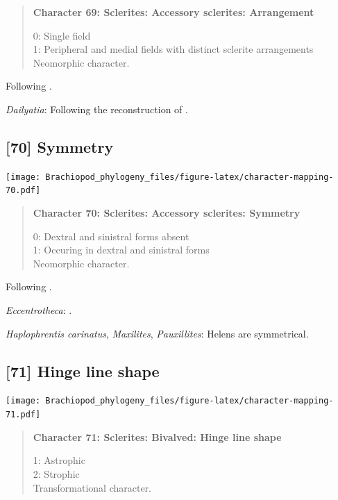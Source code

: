 \documentclass[openany]{book}
\begin{document}
\begin{quote}
\textbf{Character 69: Sclerites: Accessory sclerites: Arrangement}

0: Single field\\
1: Peripheral and medial fields with distinct sclerite arrangements\\
Neomorphic character.
\end{quote}

Following \citet{Zhao2017}.

\hypertarget{Dailyatia-coding-69}{}
\emph{Dailyatia}: Following the reconstruction of
\citet{Skovsted2015Theearly}.

\subsection*{{[}70{]} Symmetry}\label{symmetry}

\texttt{[image: Brachiopod\_phylogeny\_files/figure-latex/character-mapping-70.pdf]}

\begin{quote}
\textbf{Character 70: Sclerites: Accessory sclerites: Symmetry}

0: Dextral and sinistral forms absent\\
1: Occuring in dextral and sinistral forms\\
Neomorphic character.
\end{quote}

Following \citet{Zhao2017}.

\hypertarget{Eccentrotheca-coding-70}{}
\emph{Eccentrotheca}: \citet{Skovsted2008Thescleritome}.

\hypertarget{Haplophrentis_carinatus-coding-70}{}
\emph{Haplophrentis carinatus}, \emph{Maxilites}, \emph{Pauxillites}:
Helens are symmetrical.

\subsection*{{[}71{]} Hinge line shape}\label{hinge-line-shape}

\texttt{[image: Brachiopod\_phylogeny\_files/figure-latex/character-mapping-71.pdf]}

\begin{quote}
\textbf{Character 71: Sclerites: Bivalved: Hinge line shape}

1: Astrophic\\
2: Strophic\\
Transformational character.
\end{quote}
\end{document}
